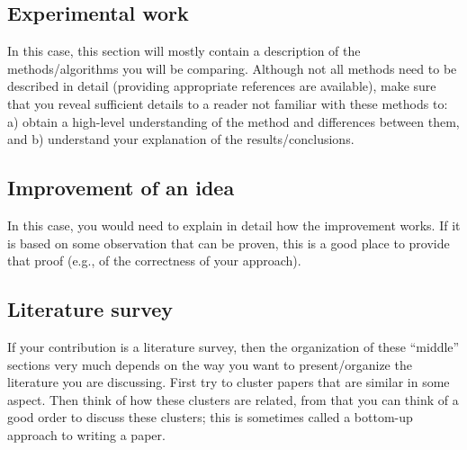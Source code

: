 



\subsection*{Experimental work}
In this case, this section will mostly contain a description of the methods/algorithms you will be comparing. Although not all methods need to be described in detail (providing appropriate references are available), make sure that you reveal sufficient details to a reader not familiar with these methods to: a) obtain a high-level understanding of the method and differences between them, and b) understand your explanation of the results/conclusions.

\subsection*{Improvement of an idea}
In this case, you would need to explain in detail how the improvement works. If it is based on some observation that can be proven, this is a good place to provide that proof (e.g., of the correctness of your approach). 

\subsection*{Literature survey}
If your contribution is a literature survey, then the organization of these ``middle'' sections very much depends on the way you want to present/organize the literature you are discussing.
First try to cluster papers that are similar in some aspect. Then think of how these clusters are related, from that you can think of a good order to discuss these clusters; this is sometimes called a bottom-up approach to writing a paper.

